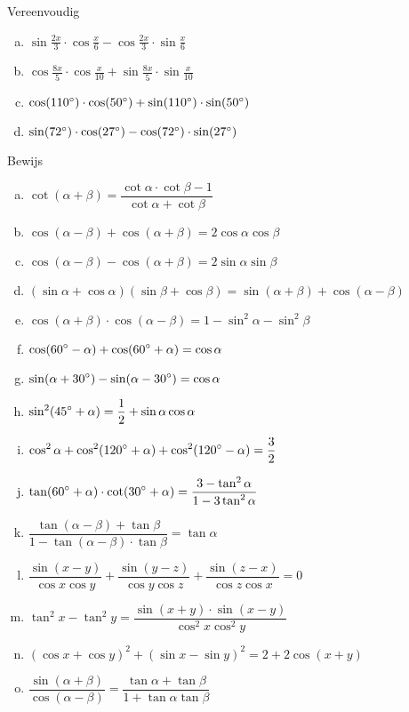 \documentclass[a4paper,12pt]{article}
\begin{document}
\begin{oefening}
Vereenvoudig
\begin{enumerate}[(a)]
  \itemsep.5em
  \item $\sin\frac{2x}{3}\cdot \cos\frac{x}{6}-\cos\frac{2x}{3}\cdot \sin\frac{x}{6}$
  \item $\cos\frac{8x}{5}\cdot \cos\frac{x}{10}+\sin\frac{8x}{5}\cdot \sin\frac{x}{10}$
  \item $\cos(110^\circ)\cdot \cos(50^\circ)+\sin(110^\circ)\cdot \sin(50^\circ)$
  \item $\sin(72^\circ)\cdot \cos(27^\circ)-\cos(72^\circ)\cdot \sin(27^\circ)$
\end{enumerate}
\end{oefening}

\begin{oefening} %
Bewijs
\begin{enumerate}[(a)]
  \itemsep.5em
  \item $\displaystyle \cot(\alpha+\beta)=\dfrac{\cot\alpha\cdot\cot\beta-1}{\cot\alpha+\cot\beta}$
  \item $\displaystyle \cos(\alpha-\beta)+\cos(\alpha+\beta)=2\cos\alpha\cos\beta$
  \item $\displaystyle \cos(\alpha-\beta)-\cos(\alpha+\beta)=2\sin\alpha\sin\beta$
  \item $\displaystyle (\sin\alpha + \cos\alpha)(\sin\beta + \cos\beta)=\sin(\alpha+\beta) + \cos(\alpha-\beta)$
  \item $\displaystyle \cos(\alpha + \beta)\cdot\cos(\alpha - \beta) = 1 - \sin^2\alpha - \sin^2\beta$
  \item $\displaystyle \cos(60^\circ - \alpha) + \cos(60^\circ + \alpha) = \cos\alpha$
  \item $\displaystyle \sin(\alpha + 30^\circ) - \sin(\alpha - 30^\circ)=\cos\alpha$
  \item $\displaystyle \sin^2(45^\circ + \alpha) = \dfrac{1}{2} + \sin\alpha\cos\alpha$
  \item $\displaystyle \cos^2\alpha + \cos^2(120^\circ + \alpha)+\cos^2(120^\circ - \alpha)=\dfrac{3}{2}$
  \item $\displaystyle \tan(60^\circ + \alpha)\cdot\cot(30^\circ + \alpha) = \dfrac{3 - \tan^2\alpha}{1-3\tan^2\alpha}$
  \item $\displaystyle \dfrac{\tan(\alpha-\beta) + \tan\beta}{1 - \tan(\alpha - \beta)\cdot\tan\beta} = \tan\alpha$
  \item $\displaystyle \dfrac{\sin(x-y)}{\cos x \cos y} + \dfrac{\sin(y-z)}{\cos y \cos z} + \dfrac{\sin(z-x)}{\cos z \cos x} = 0$
  \item $\displaystyle \tan^2 x - \tan^2 y = \dfrac{\sin(x+y)\cdot\sin(x-y)}{\cos^2 x \cos^2 y}$
  \item $\displaystyle (\cos x + \cos y)^2 + (\sin x - \sin y)^2 = 2 + 2\cos(x+y)$
  \item $\displaystyle \dfrac{\sin(\alpha + \beta)}{\cos(\alpha - \beta)} = \dfrac{\tan \alpha + \tan \beta}{1 + \tan\alpha \tan\beta}$
\end{enumerate}
\end{oefening}
\end{document}
